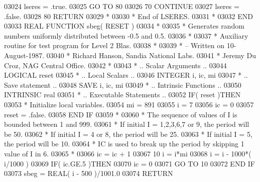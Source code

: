 \begin{DoxyCode}
03024       lseres = .true.
03025       \textcolor{keywordflow}{GO TO} 80
03026    70 \textcolor{keywordflow}{CONTINUE}
03027       lseres = .false.
03028    80 \textcolor{keywordflow}{RETURN}
03029 \textcolor{comment}{*}
03030 \textcolor{comment}{*     End of LSERES.}
03031 \textcolor{comment}{*}
03032 \textcolor{keyword}{      END}
03033 \textcolor{keyword}{      REAL }\textcolor{keyword}{FUNCTION }sbeg( RESET )
03034 \textcolor{comment}{*}
03035 \textcolor{comment}{*  Generates random numbers uniformly distributed between -0.5 and 0.5.}
03036 \textcolor{comment}{*}
03037 \textcolor{comment}{*  Auxiliary routine for test program for Level 2 Blas.}
03038 \textcolor{comment}{*}
03039 \textcolor{comment}{*  -- Written on 10-August-1987.}
03040 \textcolor{comment}{*     Richard Hanson, Sandia National Labs.}
03041 \textcolor{comment}{*     Jeremy Du Croz, NAG Central Office.}
03042 \textcolor{comment}{*}
03043 \textcolor{comment}{*     .. Scalar Arguments ..}
03044       \textcolor{keywordtype}{LOGICAL}            reset
03045 \textcolor{comment}{*     .. Local Scalars ..}
03046       \textcolor{keywordtype}{INTEGER}            i, ic, mi
03047 \textcolor{comment}{*     .. Save statement ..}
03048       \textcolor{keywordtype}{SAVE}               i, ic, mi
03049 \textcolor{comment}{*     .. Intrinsic Functions ..}
03050       \textcolor{keywordtype}{INTRINSIC}          real
03051 \textcolor{comment}{*     .. Executable Statements ..}
03052       \textcolor{keywordflow}{IF}( reset )\textcolor{keywordflow}{THEN}
03053 \textcolor{comment}{*        Initialize local variables.}
03054          mi = 891
03055          i = 7
03056          ic = 0
03057          reset = .false.
03058 \textcolor{keywordflow}{      END IF}
03059 \textcolor{comment}{*}
03060 \textcolor{comment}{*     The sequence of values of I is bounded between 1 and 999.}
03061 \textcolor{comment}{*     If initial I = 1,2,3,6,7 or 9, the period will be 50.}
03062 \textcolor{comment}{*     If initial I = 4 or 8, the period will be 25.}
03063 \textcolor{comment}{*     If initial I = 5, the period will be 10.}
03064 \textcolor{comment}{*     IC is used to break up the period by skipping 1 value of I in 6.}
03065 \textcolor{comment}{*}
03066       ic = ic + 1
03067    10 i = i*mi
03068       i = i - 1000*( i/1000 )
03069       \textcolor{keywordflow}{IF}( ic.GE.5 )\textcolor{keywordflow}{THEN}
03070          ic = 0
03071          \textcolor{keywordflow}{GO TO} 10
03072 \textcolor{keywordflow}{      END IF}
03073       sbeg = \textcolor{keywordtype}{REAL}( i - 500 )/1001.0
03074       \textcolor{keywordflow}{RETURN}

\end{DoxyCode}
